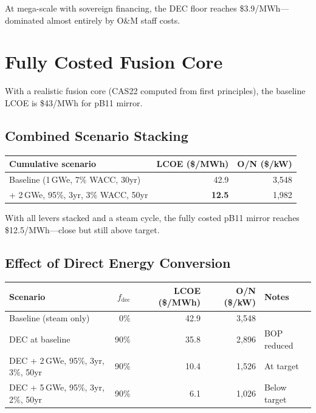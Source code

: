 \documentclass[11pt,a4paper]{article}
\begin{document}
At mega-scale with sovereign financing, the DEC floor reaches
\$3.9/MWh---dominated almost entirely by O\&M staff costs.


\section{Fully Costed Fusion Core}

With a realistic fusion core (CAS22 computed from first principles),
the baseline LCOE is \$43/MWh for pB11 mirror.

\subsection{Combined Scenario Stacking}

\begin{center}
\begin{tabular}{lrr}
\toprule
Cumulative scenario & LCOE (\$/MWh) & O/N (\$/kW) \\
\midrule
Baseline (1\,GWe, 7\% WACC, 30yr) & 42.9 & 3{,}548 \\
+ 2\,GWe, 95\%, 3yr, 3\% WACC, 50yr & \textbf{12.5} & 1{,}982 \\
\bottomrule
\end{tabular}
\end{center}

With all levers stacked and a steam cycle, the fully costed pB11
mirror reaches \$12.5/MWh---close but still above target.

\subsection{Effect of Direct Energy Conversion}

\begin{center}
\begin{tabular}{lrrrl}
\toprule
Scenario & $f_{\text{dec}}$ & LCOE (\$/MWh) & O/N (\$/kW) & Notes \\
\midrule
Baseline (steam only) & 0\% & 42.9 & 3{,}548 & \\
DEC at baseline & 90\% & 35.8 & 2{,}896 & BOP reduced \\
DEC + 2\,GWe, 95\%, 3yr, 3\%, 50yr & 90\% & 10.4 & 1{,}526 & At target \\
DEC + 5\,GWe, 95\%, 3yr, 2\%, 50yr & 90\% & 6.1 & 1{,}026 & Below target \\
\bottomrule
\end{tabular}
\end{center}
\end{document}
